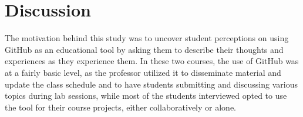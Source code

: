 






\section{Discussion}
The motivation behind this study was to uncover student perceptions on using GitHub as an educational tool by asking them to describe their thoughts and experiences as they experience them. In these two courses, the use of GitHub was at a fairly basic level, as the professor utilized it to disseminate material and update the class schedule and to have students submitting and discussing various topics during lab sessions, while most of the students interviewed opted to use the tool for their course projects, either collaboratively or alone.

